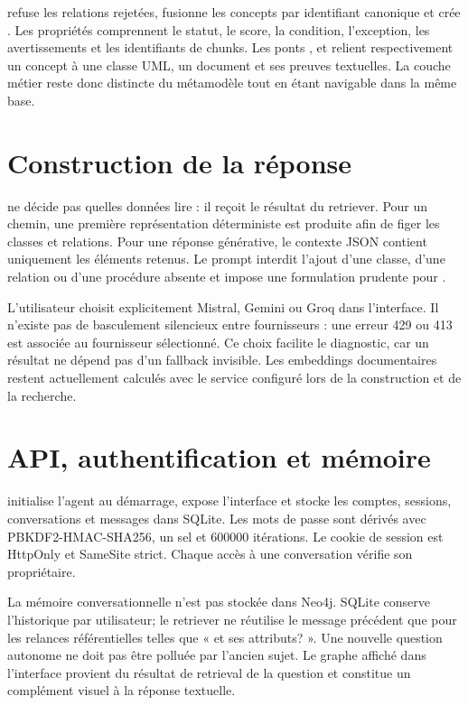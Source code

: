  refuse les relations rejetées, fusionne les concepts par identifiant
canonique et crée . Les propriétés comprennent le statut, le score,
la condition, l'exception, les avertissements et les identifiants de chunks. Les ponts
,  et  relient respectivement
un concept à une classe UML, un document et ses preuves textuelles. La couche métier reste
donc distincte du métamodèle tout en étant navigable dans la même base.

\section{Construction de la réponse}

 ne décide pas quelles données lire : il reçoit le résultat du
retriever. Pour un chemin, une première représentation déterministe est produite afin de
figer les classes et relations. Pour une réponse générative, le contexte JSON contient
uniquement les éléments retenus. Le prompt interdit l'ajout d'une classe, d'une relation ou
d'une procédure absente et impose une formulation prudente pour .

L'utilisateur choisit explicitement Mistral, Gemini ou Groq dans l'interface. Il n'existe pas
de basculement silencieux entre fournisseurs : une erreur 429 ou 413 est associée au
fournisseur sélectionné. Ce choix facilite le diagnostic, car un résultat ne dépend pas d'un
fallback invisible. Les embeddings documentaires restent actuellement calculés avec le
service configuré lors de la construction et de la recherche.

\section{API, authentification et mémoire}

 initialise l'agent au démarrage, expose l'interface et stocke les comptes,
sessions, conversations et messages dans SQLite. Les mots de passe sont dérivés avec
PBKDF2-HMAC-SHA256, un sel et 600000 itérations. Le cookie de session est HttpOnly et
SameSite strict. Chaque accès à une conversation vérifie son propriétaire.

La mémoire conversationnelle n'est pas stockée dans Neo4j. SQLite conserve l'historique
par utilisateur; le retriever ne réutilise le message précédent que pour les relances
référentielles telles que « et ses attributs? ». Une nouvelle question autonome ne doit pas
être polluée par l'ancien sujet. Le graphe affiché dans l'interface provient du résultat de
retrieval de la question et constitue un complément visuel à la réponse textuelle.

